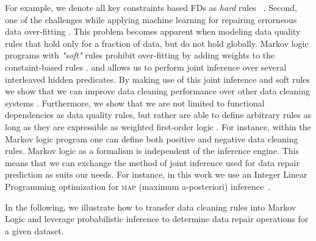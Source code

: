  For example, we denote all key constraints based FDs as \textit{hard} rules~\cite{bertossi2011database} . Second, one of the challenges while applying machine learning for repairing errorneous data over-fitting . This problem becomes apparent when modeling data quality rules that hold only for a fraction of data, but do not hold globally. Markov logic programs with \textit{"soft"} rules prohibit over-fitting by adding weights to the constaint-based rules .  and allows us to perform joint inference over several interleaved hidden predicates. By making use of this joint inference and soft rules we show that we can improve data cleaning performance over other data cleaning systems . Furthermore, we show that we are not limited to functional dependencies as data quality rules, but rather are able to define arbitrary rules as long as they are expressible as weighted first-order logic . For instance, within the Markov logic program one can define both positive and negative data cleaning rules. Markov logic as a formalism is independent of the inference engine. This means that we can exchange the method of joint inference used for data repair prediction as suits our needs. For instance, in this work we use an Integer Linear Programming optimization for \textsc{map} (maximum a-posteriori) inference~\cite{NoessnerNS13}. 
    
In the following, we illustrate how to transfer data cleaning rules into Markov Logic and leverage probabilistic inference to determine data repair operations for a given dataset. 




